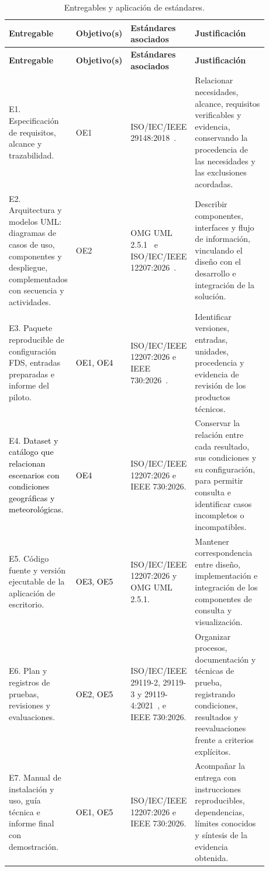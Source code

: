 {\small\setlength{\tabcolsep}{4.5pt}\renewcommand{\arraystretch}{1.18}
\begin{longtable}{|>{\raggedright\arraybackslash}p{0.23\linewidth}|>{\raggedright\arraybackslash}p{0.12\linewidth}|>{\raggedright\arraybackslash}p{0.23\linewidth}|>{\raggedright\arraybackslash}p{0.30\linewidth}|}
\caption{Entregables y aplicación de estándares.}\label{tab:entregables}\\\hline
\textbf{Entregable} & \textbf{Objetivo(s)} & \textbf{Estándares asociados} & \textbf{Justificación}\\\hline\endfirsthead
\hline\textbf{Entregable} & \textbf{Objetivo(s)} & \textbf{Estándares asociados} & \textbf{Justificación}\\\hline\endhead
E1. Especificación de requisitos, alcance y trazabilidad. & OE1 & ISO/IEC/IEEE 29148:2018~\cite{iso29148}. & Relacionar necesidades, alcance, requisitos verificables y evidencia, conservando la procedencia de las necesidades y las exclusiones acordadas.\\\hline
E2. Arquitectura y modelos UML: diagramas de casos de uso, componentes y despliegue, complementados con secuencia y actividades. & OE2 & OMG UML 2.5.1~\cite{uml251} e ISO/IEC/IEEE 12207:2026~\cite{iso12207}. & Describir componentes, interfaces y flujo de información, vinculando el diseño con el desarrollo e integración de la solución.\\\hline
E3. Paquete reproducible de configuración FDS, entradas preparadas e informe del piloto. & \textcolor{black}{OE1, OE4} & ISO/IEC/IEEE 12207:2026 e IEEE 730:2026~\cite{ieee730}. & Identificar versiones, entradas, unidades, procedencia y evidencia de revisión de los productos técnicos.\\\hline
E4. \textcolor{black}{Dataset y catálogo que relacionan escenarios con condiciones geográficas y meteorológicas.} & \textcolor{black}{OE4} & ISO/IEC/IEEE 12207:2026 e IEEE 730:2026. & Conservar la relación entre cada resultado, sus condiciones y su configuración, para permitir consulta e identificar casos incompletos o incompatibles.\\\hline
E5. Código fuente y versión ejecutable de la aplicación de escritorio. & \textcolor{black}{OE3, OE5} & ISO/IEC/IEEE 12207:2026 y OMG UML 2.5.1. & Mantener correspondencia entre diseño, implementación e integración de los componentes de consulta y visualización.\\\hline
E6. Plan y registros de pruebas, revisiones y evaluaciones. & \textcolor{black}{OE2, OE5} & ISO/IEC/IEEE 29119-2, 29119-3 y 29119-4:2021~\cite{iso291192,iso291193,iso291194}, e IEEE 730:2026. & Organizar procesos, documentación y técnicas de prueba, registrando condiciones, resultados y reevaluaciones frente a criterios explícitos.\\\hline
E7. Manual de instalación y uso, guía técnica e informe final con demostración. & \textcolor{black}{OE1, OE5} & ISO/IEC/IEEE 12207:2026 e IEEE 730:2026. & Acompañar la entrega con instrucciones reproducibles, dependencias, límites conocidos y síntesis de la evidencia obtenida.\\\hline
\end{longtable}}


